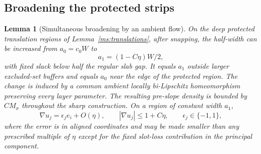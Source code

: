 \documentclass[11pt]{article}
\numberwithin{equation}{section}
\newtheorem{lemma}[theorem]{Lemma}
\theoremstyle{definition}
\theoremstyle{remark}
\begin{document}
\subsection{Broadening the protected strips}

\begin{lemma}[Simultaneous broadening by an ambient flow]
\label{ms:broadening}
On the deep protected translation regions of
Lemma~\ref{ms:translations}, after snapping, the half-width can be
increased from $a_0=c_0W$ to
\begin{equation}
 a_1=(1-C\eta)W/2,
 \label{ms:wide-halfwidth}
\end{equation}
with fixed slack below half the regular slab gap.  It equals $a_1$
outside larger excluded-set buffers and equals $a_0$ near the edge
of the protected region.  The change is induced by a common
ambient locally bi-Lipschitz homeomorphism preserving every layer
parameter.  The resulting pre-slope density is bounded by
$CM_\sigma$ throughout the sharp construction.  On a region of
constant width $a_1$,
\begin{equation}
 \nabla u_j=\epsilon_j e_i+O(\eta),\qquad
 |\nabla u_j|\le1+C\eta,
 \qquad \epsilon_j\in\{-1,1\},
 \label{ms:sharp-scalar}
\end{equation}
where the error is in aligned coordinates and may be made smaller
than any prescribed multiple of $\eta$ except for the fixed
slot-loss contribution in the principal component.
\end{lemma}
\end{document}

